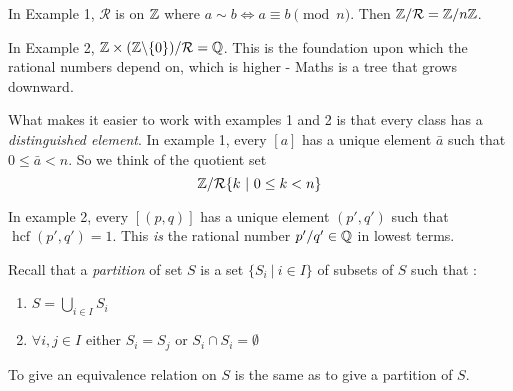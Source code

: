 \documentclass[twoside]{scrartcl}
\DeclareMathOperator{\hcf}{hcf}
\newcommand{\rel}{\mathcal{R}}
\begin{document}
In Example 1, $\rel$ is on $\mathbb{Z}$ where $a \sim b \iff a \equiv b \pmod{n}$. Then $\Z/\rel = \Z/n\Z$. 

In Example 2, $\Z \times(\Z\backslash\{0\}) /\rel = \Q$. This is the foundation upon which the rational numbers depend on, which is higher - Maths is a tree that grows downward.  \\

\begin{remark}
What makes it easier to work with examples 1 and 2 is that every class has a \emph{distinguished element}. In example 1, every $[a]$ has a unique element $\bar{a}$ such that $ 0\leq \bar{a} < n$. So we think of the quotient set 
\[\Z /\rel \{k ~|~ 0 \leq k < n\}\]	

In example 2, every $[(p,q)]$ has a unique element $(p',q')$ such that $\hcf(p',q') = 1$. This \emph{is} the rational number $p'/q' \in \mathbb{Q}$ in lowest terms. 
\end{remark}

Recall that a \emph{partition} of set $S$ is a set $\{S_i ~|~ i \in I\}$ of subsets of $S$ such that : 
\begin{enumerate}
\item $S = \bigcup_{i \in I} S_i$
\item $\forall i,j \in I$ either $S_i = S_j$ or $S_i \cap S_i = \emptyset$	
\end{enumerate}\vspace*{5pt}








\begin{theorem}
To give an equivalence relation on $S$ is the same as to give a partition of $S$. 	
\end{theorem}
\end{document}
